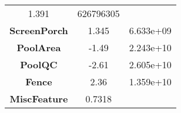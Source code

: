 \documentclass[]{article}
\begin{document}
\begin{longtable}[c]{@{}ccc@{}}
\begin{minipage}[t]{0.16\columnwidth}
1.391
\strut\end{minipage} &
\begin{minipage}[t]{0.19\columnwidth}\centering\strut
626796305
\strut\end{minipage}\tabularnewline
\begin{minipage}[t]{0.25\columnwidth}\centering\strut
\textbf{ScreenPorch}
\strut\end{minipage} &
\begin{minipage}[t]{0.16\columnwidth}\centering\strut
1.345
\strut\end{minipage} &
\begin{minipage}[t]{0.19\columnwidth}\centering\strut
6.633e+09
\strut\end{minipage}\tabularnewline
\begin{minipage}[t]{0.25\columnwidth}\centering\strut
\textbf{PoolArea}
\strut\end{minipage} &
\begin{minipage}[t]{0.16\columnwidth}\centering\strut
-1.49
\strut\end{minipage} &
\begin{minipage}[t]{0.19\columnwidth}\centering\strut
2.243e+10
\strut\end{minipage}\tabularnewline
\begin{minipage}[t]{0.25\columnwidth}\centering\strut
\textbf{PoolQC}
\strut\end{minipage} &
\begin{minipage}[t]{0.16\columnwidth}\centering\strut
-2.61
\strut\end{minipage} &
\begin{minipage}[t]{0.19\columnwidth}\centering\strut
2.605e+10
\strut\end{minipage}\tabularnewline
\begin{minipage}[t]{0.25\columnwidth}\centering\strut
\textbf{Fence}
\strut\end{minipage} &
\begin{minipage}[t]{0.16\columnwidth}\centering\strut
2.36
\strut\end{minipage} &
\begin{minipage}[t]{0.19\columnwidth}\centering\strut
1.359e+10
\strut\end{minipage}\tabularnewline
\begin{minipage}[t]{0.25\columnwidth}\centering\strut
\textbf{MiscFeature}
\strut\end{minipage} &
\begin{minipage}[t]{0.16\columnwidth}\centering\strut
0.7318
\strut\end{minipage} &

\end{longtable}
\end{document}
